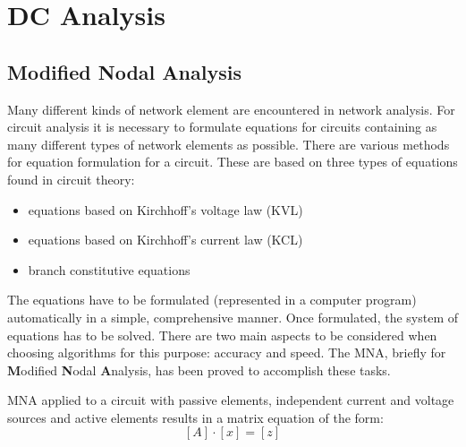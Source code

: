 %
%
%
%

\chapter{DC Analysis}

\section{Modified Nodal Analysis}
\label{sec:MNA}

Many different kinds of network element are encountered in network
analysis.  For circuit analysis it is necessary to formulate equations
for circuits containing as many different types of network elements as
possible.  There are various methods for equation formulation for a
circuit.  These are based on three types of equations found in circuit
theory:

\begin{itemize}
\item equations based on Kirchhoff's voltage law (KVL)
\item equations based on Kirchhoff's current law (KCL)
\item branch constitutive equations
\end{itemize}

The equations have to be formulated (represented in a computer
program) automatically in a simple, comprehensive manner.  Once
formulated, the system of equations has to be solved.  There are two
main aspects to be considered when choosing algorithms for this
purpose: accuracy and speed.  The MNA, briefly for \textbf{M}odified
\textbf{N}odal \textbf{A}nalysis, has been proved to accomplish these
tasks.

MNA applied to a circuit with passive elements, independent current
and voltage sources and active elements results in a matrix equation
of the form:
\begin{equation}
\left[A\right] \cdot \left[x\right] = \left[z\right]
\end{equation}

